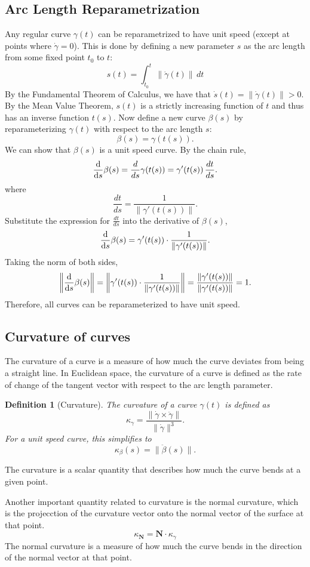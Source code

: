\documentclass[12pt]{article}
\newtheorem{definition}{Definition}[section]
\begin{document}
\subsection{Arc Length Reparametrization}
Any regular curve $\gamma(t)$ can be reparametrized to have unit speed (except at points where $\dot\gamma=0$). 
This is done by defining a new parameter $s$ as the arc length from some fixed point $t_0$ to $t$:
\[
s(t) = \int_{t_0}^{t} \|\dot\gamma(t)\|\,dt 
\]
By the Fundamental Theorem of Calculus, we have that $\dot{s}(t) = \|\dot\gamma(t)\| > 0$.
By the Mean Value Theorem, $s(t)$ is a strictly increasing function of $t$ and thus has an inverse function $t(s)$.
Now define a new curve \(\beta(s)\) by reparameterizing \(\gamma(t)\) with respect to the arc length \(s\):
\[
\beta(s)=\gamma(t(s)).
\]
We can show that \(\beta(s)\) is a unit speed curve.
By the chain rule,
\[
\dv{s}\beta(s) = \frac{d}{ds}\gamma(t(s)) = \gamma'(t(s))\,\frac{dt}{ds}.
\]
where 
\[
\frac{dt}{ds} = \frac{1}{\|\gamma'(t(s))\|}.
\]
Substitute the expression for \(\frac{dt}{ds}\) into the derivative of \(\beta(s)\),
\[
\dv{s}\beta(s) = \gamma'(t(s))\cdot \frac{1}{\|\gamma'(t(s))\|}.
\]
Taking the norm of both sides,
\[
\left\|\dv{s}\beta(s)\right\| = \left\|\gamma'(t(s)) \cdot \frac{1}{\|\gamma'(t(s))\|}\right\| = \frac{\|\gamma'(t(s))\|}{\|\gamma'(t(s))\|} = 1.
\]
Therefore, all curves can be reparameterized to have unit speed.

\subsection{Curvature of curves}
The curvature of a curve is a measure of how much the curve deviates from being a straight line.
In Euclidean space, the curvature of a curve is defined as the rate of change of the tangent vector with respect to the arc length parameter.

\begin{definition}[Curvature]\label{def:curvature}
	The curvature of a curve $\gamma(t)$ is defined as
	\[
	\kappa_{\gamma} = \frac{\|\dot{\gamma}\times\ddot{\gamma}\|}{\|\dot{\gamma}\|^{3}}.
	\]
	For a unit speed curve, this simplifies to
	\[
	\kappa_{\beta}(s) = \|\ddot{\beta}(s)\|.
	\]
\end{definition}
The curvature is a scalar quantity that describes how much the curve bends at a given point.

Another important quantity related to curvature is the normal curvature, which is the projecction of the curvature vector onto the normal vector of the surface at that point.
\[
	\kappa_{\mathbf{N}} = \mathbf{N} \cdot \kappa_{\gamma}
\]
The normal curvature is a measure of how much the curve bends in the direction of the normal vector at that point.
\end{document}

